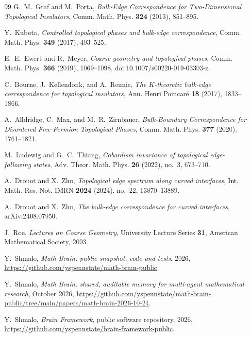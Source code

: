 \documentclass[11pt]{article}
\numberwithin{equation}{section}
\theoremstyle{definition}
\theoremstyle{remark}
\begin{document}
\begin{thebibliography}{99}
G.~M.~Graf and M.~Porta,
\emph{Bulk-Edge Correspondence for Two-Dimensional Topological Insulators},
Comm. Math. Phys. \textbf{324} (2013), 851--895.

Y.~Kubota,
\emph{Controlled topological phases and bulk-edge correspondence},
Comm. Math. Phys. \textbf{349} (2017), 493--525.

E.~E.~Ewert and R.~Meyer,
\emph{Coarse geometry and topological phases},
Comm. Math. Phys. \textbf{366} (2019), 1069--1098,
doi:10.1007/s00220-019-03303-z.

C.~Bourne, J.~Kellendonk, and A.~Rennie,
\emph{The $K$-theoretic bulk-edge correspondence for topological insulators},
Ann. Henri Poincar\'e \textbf{18} (2017), 1833--1866.

A.~Alldridge, C.~Max, and M.~R.~Zirnbauer,
\emph{Bulk-Boundary Correspondence for Disordered Free-Fermion Topological Phases},
Comm. Math. Phys. \textbf{377} (2020), 1761--1821.

M.~Ludewig and G.~C.~Thiang,
\emph{Cobordism invariance of topological edge-following states},
Adv. Theor. Math. Phys. \textbf{26} (2022), no.~3, 673--710.

A.~Drouot and X.~Zhu,
\emph{Topological edge spectrum along curved interfaces},
Int. Math. Res. Not. IMRN \textbf{2024} (2024), no.~22, 13870--13889.

A.~Drouot and X.~Zhu,
\emph{The bulk-edge correspondence for curved interfaces},
arXiv:2408.07950.

J.~Roe,
\emph{Lectures on Coarse Geometry},
University Lecture Series \textbf{31}, American Mathematical Society, 2003.

 Y.~Shmalo, \emph{Math Brain: public snapshot, code and tests}, 2026, \url{https://github.com/yspennstate/math-brain-public}.

 Y.~Shmalo, \emph{Math Brain: shared, auditable memory for multi-agent mathematical research}, October 2026, \url{https://github.com/yspennstate/math-brain-public/tree/main/papers/math-brain-2026-10-24}.

 Y.~Shmalo, \emph{Brain Framework}, public software repository, 2026, \url{https://github.com/yspennstate/brain-framework-public}.

\end{thebibliography}
\end{document}
